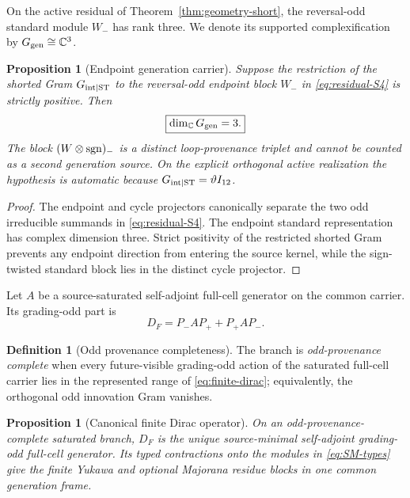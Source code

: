 \documentclass[11pt]{article}
\newtheorem{proposition}[theorem]{Proposition}
\theoremstyle{definition}
\newtheorem{definition}[theorem]{Definition}
\theoremstyle{remark}
\newcommand{\C}{\mathbb C}
\begin{document}
On the active residual of Theorem~\ref{thm:geometry-short}, the
reversal-odd standard module $W_-$ has rank three.  We denote its supported
complexification by $G_{\rm gen}\cong\C^3$.

\begin{proposition}[Endpoint generation carrier]
\label{prop:generation-carrier}
Suppose the restriction of the shorted Gram
$G_{{\rm int}\mid{\rm ST}}$ to the reversal-odd endpoint block $W_-$ in
\eqref{eq:residual-S4} is strictly positive.  Then
\begin{equation}
\boxed{\dim_\C G_{\rm gen}=3.}
\label{eq:three-generations}
\end{equation}
The block $(W\otimes{\rm sgn})_-$ is a distinct loop-provenance triplet and
cannot be counted as a second generation source.  On the explicit orthogonal
active realization the hypothesis is automatic because
$G_{{\rm int}\mid{\rm ST}}=\vartheta I_{12}$.
\end{proposition}

\begin{proof}
The endpoint and cycle projectors canonically separate the two odd irreducible
summands in \eqref{eq:residual-S4}.  The endpoint standard representation has
complex dimension three.  Strict positivity of the restricted shorted Gram
prevents any endpoint direction from entering the source kernel, while the
sign-twisted standard block lies in the distinct cycle projector.
\end{proof}

Let $A$ be a source-saturated self-adjoint full-cell generator on the common
carrier.  Its grading-odd part is
\begin{equation}
D_F
=
P_-AP_+ + P_+AP_-.
\label{eq:finite-dirac}
\end{equation}

\begin{definition}[Odd provenance completeness]
The branch is \emph{odd-provenance complete} when every future-visible
grading-odd action of the saturated full-cell carrier lies in the represented
range of \eqref{eq:finite-dirac}; equivalently, the orthogonal odd innovation
Gram vanishes.
\end{definition}

\begin{proposition}[Canonical finite Dirac operator]
\label{prop:finite-dirac}
On an odd-provenance-complete saturated branch, $D_F$ is the unique
source-minimal self-adjoint grading-odd full-cell generator.  Its typed
contractions onto the modules in \eqref{eq:SM-types} give the finite Yukawa and
optional Majorana residue blocks in one common generation frame.
\end{proposition}
\end{document}
